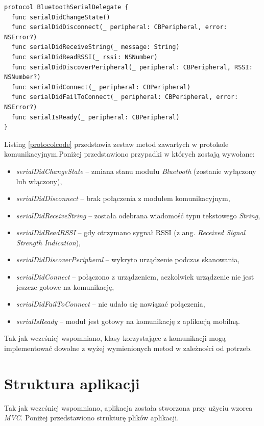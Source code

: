 \begin{minipage}{\textwidth}
	\begin{lstlisting}[label=protocolcode,caption=Protokół odpowiedzialny za komunikację między urządzeniami.]
protocol BluetoothSerialDelegate {
  func serialDidChangeState()
  func serialDidDisconnect(_ peripheral: CBPeripheral, error: NSError?)
  func serialDidReceiveString(_ message: String)
  func serialDidReadRSSI(_ rssi: NSNumber)
  func serialDidDiscoverPeripheral(_ peripheral: CBPeripheral, RSSI: NSNumber?)
  func serialDidConnect(_ peripheral: CBPeripheral)
  func serialDidFailToConnect(_ peripheral: CBPeripheral, error: NSError?)
  func serialIsReady(_ peripheral: CBPeripheral)
}
	\end{lstlisting}
\end{minipage}

Listing \ref{protocolcode} przedstawia zestaw metod zawartych w protokole komunikacyjnym.Poniżej przedstawiono przypadki w których zostają wywołane:

\begin{itemize}
\item \textit{serialDidChangeState} –  zmiana stanu modułu \textit{Bluetooth} (zostanie wyłączony lub włączony),
\item \textit{serialDidDisconnect} –  brak połączenia z modułem komunikacyjnym,
\item \textit{serialDidReceiveString} – została odebrana wiadomość typu tekstowego \textit{String},
\item \textit{serialDidReadRSSI} – gdy otrzymano sygnał RSSI (z ang. \textit{Received Signal Strength Indication}),
\item \textit{serialDidDiscoverPeripheral} – wykryto urządzenie podczas skanowania,
\item \textit{serialDidConnect} – połączono z urządzeniem, aczkolwiek urządzenie nie jest jeszcze gotowe na komunikację,
\item \textit{serialDidFailToConnect} – nie udało się nawiązać połączenia,
\item \textit{serialIsReady} – moduł jest gotowy na komunikację z aplikacją mobilną.
\end{itemize}

Tak jak wcześniej wspomniano, klasy korzystające z komunikacji mogą implementować dowolne z wyżej wymienionych metod w zależności od potrzeb.

\section{Struktura aplikacji}
Tak jak wcześniej wspomniano, aplikacja została stworzona przy użyciu wzorca \textit{MVC}. Poniżej przedstawiono strukturę plików aplikacji.

